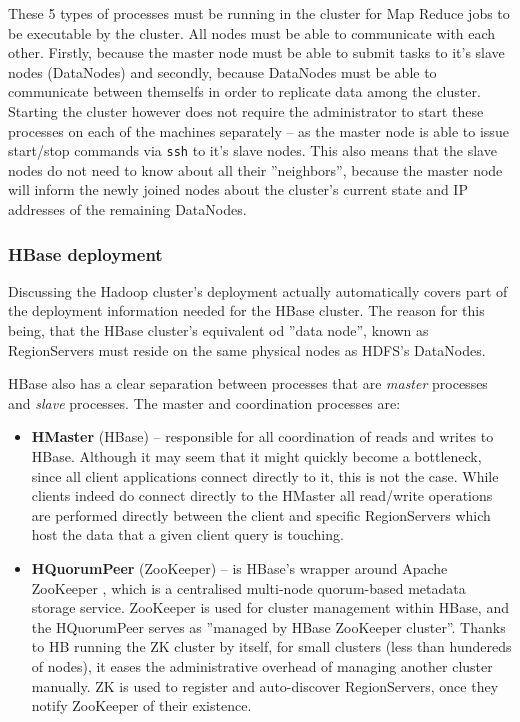 These 5 types of processes must be running in the cluster for Map Reduce jobs to be executable by the cluster. All nodes must be able to communicate with each other. Firstly, because the master node must be able to submit tasks to it's slave nodes (DataNodes) and secondly, because DataNodes must be able to communicate between themselfs in order to replicate data among the cluster. Starting the cluster however does not require the administrator to start these processes on each of the machines separately -- as the master node is able to issue start/stop commands via \verb|ssh| to it's slave nodes. This also means that the slave nodes do not need to know about all their ''neighbors'', because the master node will inform the newly joined nodes about the cluster's current state and IP addresses of the remaining DataNodes.


\subsubsection{HBase deployment}
\label{sec:hbase-deployment}
Discussing the Hadoop cluster's deployment actually automatically covers part of the deployment information needed for the HBase cluster. The reason for this being, that the HBase cluster's equivalent od ''data node'', known as RegionServers must reside on the same physical nodes as HDFS's DataNodes.

HBase also has a clear separation between processes that are \textit{master} processes and \textit{slave} processes.
The master and coordination processes are:

\begin{itemize}
\item \textbf{HMaster} (HBase) -- responsible for all coordination of reads and writes to HBase. Although it may seem 
                                  that it might quickly become a bottleneck, since all client applications connect 
                                  directly to it, this is not the case. While clients indeed do connect directly to the 
                                  HMaster all read/write operations are performed directly between the client and             
                                  specific RegionServers which host the data that a given client query is touching.
\item \textbf{HQuorumPeer} (ZooKeeper) -- is HBase's wrapper around Apache ZooKeeper \cite{zoo-keeper}, which is a
                                          centralised multi-node quorum-based metadata storage service. ZooKeeper is used 
                                          for cluster management within HBase, and the HQuorumPeer serves as ''managed by
                                          HBase ZooKeeper cluster''. Thanks to HB running the ZK cluster by itself, for 
                                          small clusters (less than hundereds of nodes), it eases the administrative 
                                          overhead of managing another cluster manually. ZK is used to register and 
                                          auto-discover RegionServers, once they notify ZooKeeper of their existence.
\end{itemize}

